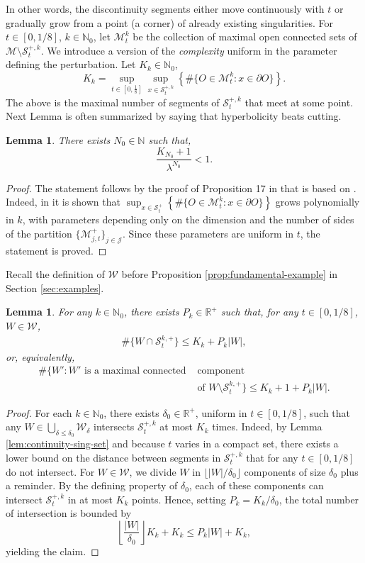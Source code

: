 \documentclass{amsart}
\numberwithin{equation}{section}
\newtheorem{lemma}[theorem]{Lemma}
\renewcommand{\le}{\leqslant}
\newcommand\cJ{{\mathcal J}}
\newcommand\cM{{\mathcal M}}
\newcommand\cS{{\mathcal S}}
\newcommand\cW{{\mathcal W}}
\newcommand\bN{{\mathbb N}}
\newcommand\bR{{\mathbb R}}
\begin{document}
In other words, the discontinuity segments either move continuously with \(t\) or gradually grow from a point (a corner) of already existing singularities. For \(t \in [0,1/8]\), \(k \in \bN_0\), let \(\cM^k_t\) be the collection of maximal open connected sets of \(\cM \setminus \cS^{+,k}_t\). We introduce a version of the \textit{complexity} uniform in the parameter defining the perturbation. Let \(K_k \in \bN_0\),
\[
  K_k = \sup_{t \in [0,\frac{1}{8}]}\sup_{x \in \cS_t^{+,k}}\left\{\# \{O \in \cM^k_t: x \in \partial O\}\right\}.
\]
The above is the maximal number of segments of \(\cS_t^{+,k}\) that meet at some point. Next Lemma is often summarized by saying that hyperbolicity beats cutting.
\begin{lemma}\label{lem:hyp-beats-cutting}
  There exists \(N_0 \in \bN\) such that,
  \[
       \frac{K_{N_0} +1}{\lambda^{N_0}} < 1.
  \]
\end{lemma}
\begin{proof}
The statement follows by the proof of Proposition 17 in \cite{BG09} that is based on \cite{Buzzi97}. Indeed, in \cite{BG09} it is shown that \(\sup_{x \in \cS_t^+}\left\{\# \{O \in \cM^k_t: x \in \partial O\}\right\}\) grows polynomially in \(k\), with parameters depending only on the dimension and the number of sides of the partition \(\{\cM_{j, t}^+\}_{j \in \cJ}\). Since these parameters are uniform in \(t\), the statement is proved.
\end{proof}
Recall the definition of \(\cW\) before Proposition \ref{prop:fundamental-example} in Section \ref{sec:examples}.
\begin{lemma}\label{lem:trasversality2}
  For any \(k \in \bN_0\), there exists \(P_k \in \bR^+\) such that, for any \(t \in [0,1/8]\), \(W \in \cW\),
  \[
  \begin{split}
    \#\{W \cap \cS_t^{k,+}\} \le K_{k} + P_{k}|W|,
  \end{split}
  \]
  or, equivalently,
  \[
  \begin{split}
\# \{W': W' \text{ is a maximal connected}& \text{ component} \\
&\text{ of }W \setminus \cS_t^{k,+}\} \le K_{k}+1 + P_k |W|.
  \end{split}
  \]
\end{lemma}
\begin{proof}
For each \(k \in \bN_0\), there exists \(\delta_0 \in \bR^+\), uniform in \(t \in [0,1/8]\), such that any \(W \in \bigcup_{\delta \le \delta_0}\cW_{\delta}\) intersects \(\cS_t^{+,k}\) at most \(K_k\) times. Indeed, by Lemma \ref{lem:continuity-sing-set} and because \(t\) varies in a compact set, there exists a lower bound on the distance between segments in \(\cS_t^{+,k}\) that for any \(t \in [0,1/8]\) do not intersect. For \(W \in \cW\), we divide \(W\) in \(\lfloor |W|/\delta_0 \rfloor\) components of size \(\delta_0\) plus a reminder. By the defining property of \(\delta_0\), each of these components can intersect \(\cS_t^{+,k}\) in at most \(K_k\) points. Hence, setting \(P_k = K_k/\delta_0\), the total number of intersection is bounded by
\[
\left \lfloor\frac{|W|}{\delta_0} \right \rfloor K_k + K_k \le P_k |W| + K_k,
\]
yielding the claim.
\end{proof}
\end{document}
